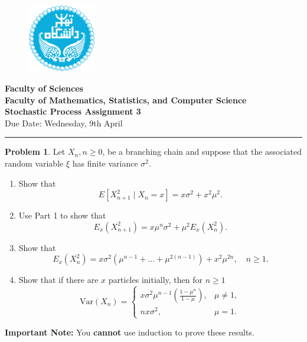 \documentclass[12pt]{extreport}
\theoremstyle{definition}
\newtheorem{prob}{Problem}
\begin{document}
	\begin{figure}
		\centering \includegraphics[height=3cm]{Logo.png}
	\end{figure}
    \vspace{-10mm}
	\begin{center}
	\textbf{Faculty of Sciences}
		\\
	\textbf{Faculty of Mathematics, Statistics, and Computer Science}
		\\
	\textbf{\Large Stochastic Process Assignment 3}\\
	Due Date: Wednesday, 9th April
	\par\noindent\rule{\textwidth}{0.4pt}
	\end{center}
	
	\begin{prob}
        \noindent Let $X_n, n \geq 0$, be a branching chain and suppose that the associated random variable $\xi$ has finite variance $\sigma^2$. 
        
        \begin{enumerate}
            \item Show that
            \[
            E[X_{n+1}^2 \mid X_n = x] = x\sigma^2 + x^2\mu^2.
            \]
            
            \item Use Part 1 to show that
            \[
            E_x(X_{n+1}^2) = x\mu^n\sigma^2 + \mu^2 E_x(X_n^2).
            \]
            
            \item Show that
            \[
            E_x(X_n^2) = x\sigma^2(\mu^{n-1} + \dots + \mu^{2(n-1)}) + x^2\mu^{2n}, \quad n \geq 1.
            \]
            
            \item Show that if there are $x$ particles initially, then for $n \geq 1$
            \[
            \text{Var} (X_n) =
            \begin{cases}
            x\sigma^2 \mu^{n-1} \left(\frac{1 - \mu^n}{1 - \mu}\right), & \mu \neq 1, \\
            n x \sigma^2, & \mu = 1.
            \end{cases}
            \]
        \end{enumerate}
        \noindent \textbf{Important Note:} You \textbf{cannot} use induction to prove these results.
	\end{prob}
	
\end{document}

